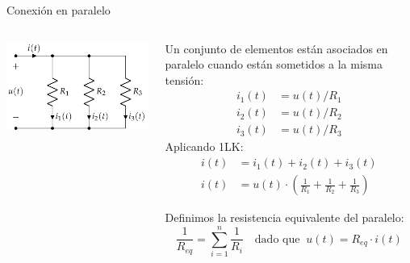 \documentclass[aspectratio=169, xcolor={usenames,svgnames,dvipsnames}]{beamer}
\begin{document}
\begin{frame}{Conexión en paralelo}
    \begin{columns}
    \begin{column}{0.4\columnwidth}
        \vspace{-10mm}
        \begin{center}
        \includegraphics[width=1\linewidth]{../figs/AsociacionParalelo.pdf}
        \end{center}
    \end{column}
    \begin{column}{0.6\columnwidth}
        Un conjunto de elementos están asociados en paralelo cuando están sometidos a la \alert{misma tensión}:
        \vspace{-2mm}
        \begin{align*}      
          i_1(t) &= u(t)/R_1\\
          i_2(t) &= u(t)/R_2\\
          i_3(t) &= u(t)/R_3      
        \end{align*}    
        \vspace{-2mm}
        Aplicando \alert{1LK}:
        \begin{align*} 
            i(t)& = i_1(t) + i_2(t) + i_3(t) \\
            i(t) &= u(t) \cdot \left(\frac{1}{R_1} + \frac{1}{R_2} + \frac{1}{R_3}\right)
        \end{align*}    
    
        Definimos la \alert{resistencia equivalente} del paralelo:
        \[
          \boxed{\frac{1}{R_{eq}} = \sum_{i = 1}^n \frac{1}{R_i}} \quad \textrm{dado que} \;\; u(t) = R_{eq} \cdot i(t)
        \]
    \end{column}
    \end{columns}
\end{frame}
\end{document}
